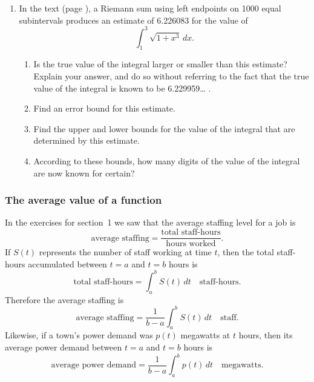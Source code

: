 \begin{enumerate}
  \begin{enumerate}
  \item Find an error bound for this estimate, and use it to construct
the best possible lower and upper bounds
	\[
A \leq \int_0^{\pi/2} \sin{x} \, dx \leq B.
\]


\end{enumerate}
\item In the text (page \pageref{ref1}), a Riemann sum using left
endpoints on 1000 equal subintervals produces an estimate of 6.226083
for the value of
	\[
\int_1^3 \sqrt{1 + x^3} \, dx.
\]


  \begin{enumerate}
  \item Is the true value of the integral larger or smaller than this
estimate?  Explain your answer, and do so without referring to the
fact that the true value of the integral is known to be 6.229959\ldots
.

  \item Find an error bound for this estimate.

  \item Find the upper and lower bounds for the value of the integral
that are determined by this estimate.

  \item According to these bounds, how many digits of the value of the
integral are now known for certain?


\end{enumerate}
\end{enumerate}
\subsubsection{The average value of a function}
\label{subsubsec:the-average-value-of-a-function}
\label{average-begin}

In the exercises for section~1 we saw that the average staffing level
for a job is
\[
\mbox{average staffing} 
        = \dfrac{\mbox{total staff-hours}}{\mbox{hours worked}}.
\]
If $S(t)$ represents the number of staff working at time $t$, then the
total staff-hours accumulated between $t = a$ and $t = b$ hours is
	\[
\mbox{total staff-hours} = \int_a^b S(t) \, dt 
		\quad \mbox{staff-hours}.
\]
Therefore the average staffing is
	\[
\mbox{average staffing} = \dfrac{1}{b-a}
		\int_a^b S(t) \, dt \quad \mbox{staff}.
\]
Likewise, if a town's power demand was $p(t)$ megawatts at $t$ hours, then its average power demand between $t = a$ and $t = b$ hours is
	\[
\mbox{average power demand} = \dfrac{1}{b-a}
		\int_a^b p(t) \, dt \quad \mbox{megawatts}.
\]

